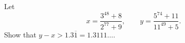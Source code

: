 Let
\[
x=\dfrac{3^{48}+8}{2^{77}+9},\qquad y=\dfrac{5^{74}+11}{11^{49}+5}.
\]
Show that $y-x>1.3\overline{1}=1.3111\ldots$.
